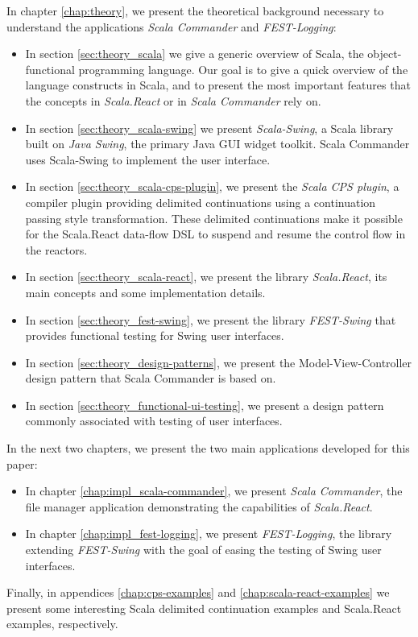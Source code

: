 In chapter \ref{chap:theory}, we present the theoretical background necessary to understand the applications \emph{Scala Commander} and \emph{FEST-Logging}:
\begin{itemize}
\item In section \ref{sec:theory_scala} we give a generic overview of Scala, the object-functional programming language. Our goal is to give a quick overview of the language constructs in Scala, and to present the most important features that the concepts in \emph{Scala.React} or in \emph{Scala Commander} rely on. %

\item In section \ref{sec:theory_scala-swing} we present \emph{Scala-Swing}\cite{ScalaSwing}, a Scala library built on \emph{Java Swing}, the primary Java GUI widget toolkit. \cite{Robinson:1999:SWI:554530} Scala Commander uses Scala-Swing to implement the user interface.

\item In section \ref{sec:theory_scala-cps-plugin}, we present the \emph{Scala CPS plugin}, a compiler plugin providing delimited continuations using a continuation passing style transformation. These delimited continuations make it possible for the Scala.React data-flow DSL to suspend and resume the control flow in the reactors.

\item In section \ref{sec:theory_scala-react}, we present the library \emph{Scala.React}, its main concepts and some implementation details.

\item In section \ref{sec:theory_fest-swing}, we present the library \emph{FEST-Swing} that provides functional testing for Swing user interfaces.

\item In section \ref{sec:theory_design-patterns}, we present the Model-View-Controller design pattern that Scala Commander is based on.

\item In section \ref{sec:theory_functional-ui-testing}, we present a design pattern commonly associated with testing of user interfaces.
\end{itemize}

\noindent In the next two chapters, we present the two main applications developed for this paper:
\begin{itemize}
\item In chapter \ref{chap:impl_scala-commander}, we present \emph{Scala Commander}, the file manager application demonstrating the capabilities of \emph{Scala.React}.
\item In chapter \ref{chap:impl_fest-logging}, we present \emph{FEST-Logging}, the library extending \emph{FEST-Swing} with the goal of easing the testing of Swing user interfaces.
\end{itemize}

\noindent
Finally, in appendices \ref{chap:cps-examples} and \ref{chap:scala-react-examples} we present some interesting Scala delimited continuation examples and Scala.React examples, respectively.



